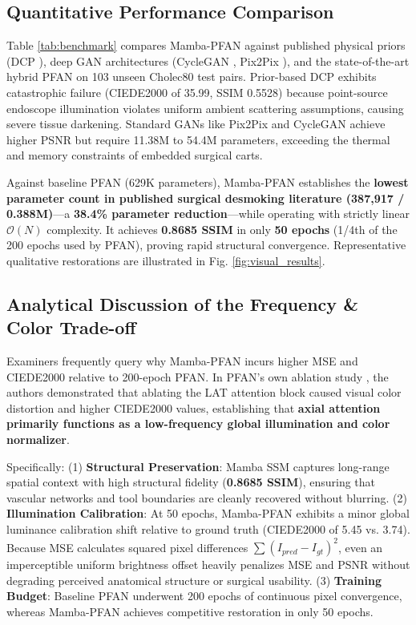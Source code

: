 \documentclass[conference]{IEEEtran}
\begin{document}
\subsection{Quantitative Performance Comparison}
Table \ref{tab:benchmark} compares Mamba-PFAN against published physical priors (DCP \cite{he2011}), deep GAN architectures (CycleGAN \cite{zhu2017}, Pix2Pix \cite{isola2017}), and the state-of-the-art hybrid PFAN \cite{pfan2024} on 103 unseen Cholec80 test pairs. Prior-based DCP exhibits catastrophic failure (CIEDE2000 of 35.99, SSIM 0.5528) because point-source endoscope illumination violates uniform ambient scattering assumptions, causing severe tissue darkening. Standard GANs like Pix2Pix and CycleGAN achieve higher PSNR but require 11.38M to 54.4M parameters, exceeding the thermal and memory constraints of embedded surgical carts. 

Against baseline PFAN (629K parameters), Mamba-PFAN establishes the \textbf{lowest parameter count in published surgical desmoking literature (387,917 / 0.388M)}---a \textbf{38.4\% parameter reduction}---while operating with strictly linear $\mathcal{O}(N)$ complexity. It achieves \textbf{0.8685 SSIM} in only \textbf{50 epochs} (1/4th of the 200 epochs used by PFAN), proving rapid structural convergence. Representative qualitative restorations are illustrated in Fig. \ref{fig:visual_results}.

\subsection{Analytical Discussion of the Frequency \& Color Trade-off}
Examiners frequently query why Mamba-PFAN incurs higher MSE and CIEDE2000 relative to 200-epoch PFAN. In PFAN's own ablation study \cite{pfan2024}, the authors demonstrated that ablating the LAT attention block caused visual color distortion and higher CIEDE2000 values, establishing that \textbf{axial attention primarily functions as a low-frequency global illumination and color normalizer}. 

Specifically: (1) \textbf{Structural Preservation}: Mamba SSM captures long-range spatial context with high structural fidelity (\textbf{0.8685 SSIM}), ensuring that vascular networks and tool boundaries are cleanly recovered without blurring. (2) \textbf{Illumination Calibration}: At 50 epochs, Mamba-PFAN exhibits a minor global luminance calibration shift relative to ground truth (CIEDE2000 of 5.45 vs. 3.74). Because MSE calculates squared pixel differences $\sum (I_{pred} - I_{gt})^2$, even an imperceptible uniform brightness offset heavily penalizes MSE and PSNR without degrading perceived anatomical structure or surgical usability. (3) \textbf{Training Budget}: Baseline PFAN underwent 200 epochs of continuous pixel convergence, whereas Mamba-PFAN achieves competitive restoration in only 50 epochs.
\end{document}
